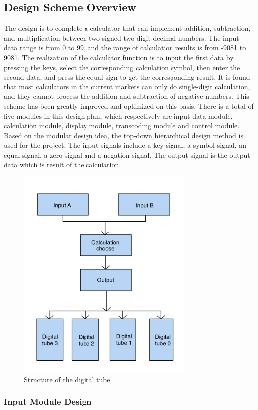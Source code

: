 \documentclass[conference,compsoc]{IEEEtran}
\begin{document}
\subsection{Design Scheme Overview}
The design is to complete a calculator that can implement addition, subtraction, and multiplication between two signed two-digit decimal numbers. The input data range is from 0 to 99, and the range of calculation results is from -9081 to 9081. The realization of the calculator function is to input the first data by pressing the keys, select the corresponding calculation symbol, then enter the second data, and press the equal sign to get the corresponding result. 
It is found that most calculators in the current markets can only do single-digit calculation, and they cannot process the addition and subtraction of negative numbers. This scheme has been greatly improved and optimized on this basis. There is a total of five modules in this design plan, which respectively are input data module, calculation module, display module, transcoding module and control module. Based on the modular design idea, the top-down hierarchical design method is used for the project. The input signals include a key signal, a symbol signal, an equal signal, a zero signal and a negation signal. The output signal is the output data which is result of the calculation.
\begin{figure}[H]
	\centering
	\includegraphics[width=8.5cm]{fig3}
	\caption{Structure of the digital tube}
	\label{Fig3}
\end{figure}
\subsubsection{Input Module Design}
\hfill\\
\end{document}
